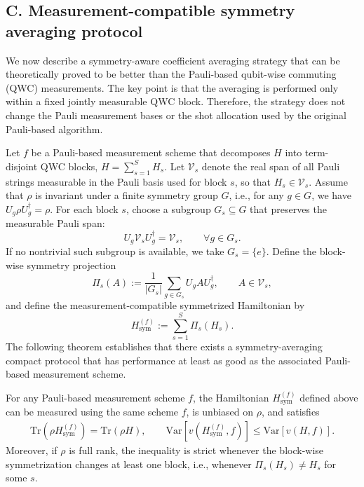 \documentclass[prl,aps,notitlepage,superscriptaddress,showpacs,nofootinbib]{revtex4-2}
\newcommand{\red}[1]{{\color{red} #1}}
\begin{document}
\red{\subsection{C. Measurement-compatible symmetry averaging protocol}

We now describe a symmetry-aware coefficient averaging strategy that can be theoretically proved to be better than the Pauli-based qubit-wise commuting (QWC) measurements. 
The key point is that the averaging is performed only within a fixed jointly measurable QWC block. Therefore, the strategy does not change the Pauli measurement bases or the shot allocation used by the original Pauli-based algorithm.


Let \(f\) be a Pauli-based measurement scheme that decomposes \(H\) into term-disjoint QWC blocks, $  H=\sum_{s=1}^S H_s.$
Let \(\mathcal V_s\) denote the real span of all Pauli strings measurable in the Pauli basis used for block \(s\), so that \(H_s\in\mathcal V_s\). Assume that \(\rho\) is invariant under a finite symmetry group \(G\), i.e., for any $g\in G$, we have $  U_g\rho U_g^\dagger=\rho$.
For each block \(s\), choose a subgroup \(G_s\subseteq G\) that preserves the measurable Pauli span:
\begin{equation}
        U_g\mathcal V_sU_g^\dagger=\mathcal V_s,
    \qquad \forall g\in G_s.
\end{equation}
If no nontrivial such subgroup is available, we take \(G_s=\{e\}\). Define the block-wise symmetry projection
\begin{equation}
        \Pi_s(A)
    :=
    \frac1{|G_s|}
    \sum_{g\in G_s}U_gAU_g^\dagger,
    \qquad A\in\mathcal V_s,
\end{equation}
and define the measurement-compatible symmetrized Hamiltonian by
\begin{equation}
        H_{\mathrm{sym}}^{(f)}
    :=
    \sum_{s=1}^S \Pi_s(H_s).
\end{equation}
The following theorem establishes that there exists a symmetry-averaging compact protocol that has performance at least as good as the associated Pauli-based measurement scheme.


\begin{theorem}%
\label{thm:symmetric_average}
For any Pauli-based measurement scheme \(f\), the Hamiltonian \(H_{\mathrm{sym}}^{(f)}\) defined above can be measured using the same scheme \(f\), is unbiased on \(\rho\), and satisfies
\begin{align}
        \mathrm{Tr}\!\left(\rho H_{\mathrm{sym}}^{(f)}\right)
    =
    \mathrm{Tr}(\rho H),
    \qquad
    \mathrm{Var}\!\left[v(H_{\mathrm{sym}}^{(f)},f)\right]
    \le
    \mathrm{Var}\!\left[v(H,f)\right].
\end{align}
Moreover, if \(\rho\) is full rank, the inequality is strict whenever the block-wise symmetrization changes at least one block, i.e., whenever \(\Pi_s(H_s)\neq H_s\) for some \(s\).
\end{theorem}


}
\end{document}
